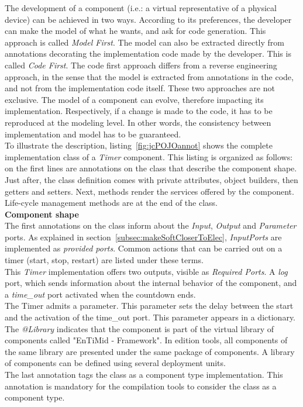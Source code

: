 The development of a component (i.e.: a virtual representative of a physical device) can be achieved in two ways. According to its preferences, the developer can make the model of what he wants, and ask for code generation. This approach is called {\it Model First}. The model can also be extracted directly from annotations decorating the implementation code made by the developer. This is called {\it Code First}. The code first approach differs from a reverse engineering approach, in the sense that the model is extracted from annotations in the code, and not from the implementation code itself. These two approaches are not exclusive. The model of a component can evolve, therefore impacting its implementation. Respectively, if a change is made to the code, it has to be reproduced at the modeling level. In other words, the consistency between implementation and model has to be guaranteed.\\

To illustrate the description, listing~\ref{fig:jcPOJOannot} shows the complete implementation class of a {\it Timer} component. This listing is organized as follows: on the first lines are annotations on the class that describe the component shape. Just after, the class definition comes with private attributes, object builders, then getters and setters. Next, methods render the services offered by the component. Life-cycle management methods are at the end of the class.\\

{\bf Component shape}\\
The first annotations on the class inform about the {\it Input}, {\it Output} and {\it Parameter} ports. As explained in section~\ref{subsec:makeSoftCloserToElec}, {\it InputPorts} are implemented as {\it provided ports}. Common actions that can be carried out on a timer (start, stop, restart) are listed under these terms.\\
This {\it Timer} implementation offers two outputs, visible as {\it Required Ports}. A {\it log} port, which sends information about the internal behavior of the component, and a {\it time\_out} port activated when the countdown ends.\\
The Timer admits a parameter. This parameter sets the delay between the start and the activation of the time\_out port. This parameter appears in a dictionary.\\
The {\it @Library} indicates that the component is part of the virtual library of components called "EnTiMid - Framework". In edition tools, all components of the same library are presented under the same package of components. A library of components can be defined using several deployment units.\\
The last annotation tags the class as a component type implementation. This annotation is mandatory for the compilation tools to consider the class as a component type.\\

